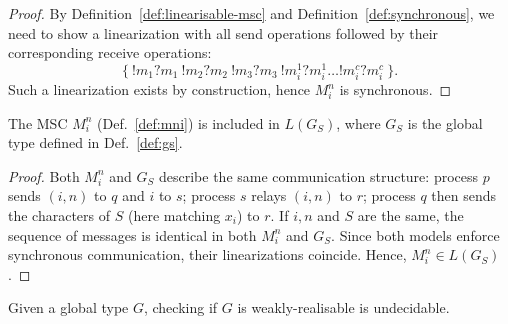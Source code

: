 \begin{proof}
	By Definition~\ref{def:linearisable-msc} and
	Definition~\ref{def:synchronous},
	we need to show a linearization with all send operations
	followed by their corresponding receive operations:
	$$
		\{~!m_1?m_1\ !m_2?m_2\ !m_3?m_3\ !m_i^1?m_i^1 \ldots !m_i^c?m_i^c~\}.
	$$
	Such a linearization exists by construction, hence $M_i^n$ is synchronous.
\end{proof}

\bigskip

\begin{lemma}\label{lemma:msgs}
	The MSC $M^n_i$ (Def.~\ref{def:mni}) is included in $L(G_S)$, where $G_S$
	is the global type defined in Def.~\ref{def:gs}.
\end{lemma}

\begin{proof}
	Both $M^n_i$ and $G_S$ describe the same communication structure:
	process $p$ sends $(i,n)$ to $q$ and $i$ to $s$;
	process $s$ relays $(i,n)$ to $r$;
	process $q$ then sends the characters of $S$ (here matching $x_i$) to $r$.
	If $i,n$ and $S$ are the same, the sequence of messages is identical in both 
	$M^n_i$ and $G_S$. Since both models enforce synchronous communication, 
	their linearizations coincide. Hence, $M^n_i \in L(G_S)$.
\end{proof}

\bigskip

\begin{theorem}\label{thm:main}
	Given a global type $G$, checking if $G$ is weakly-realisable is undecidable.
\end{theorem}


